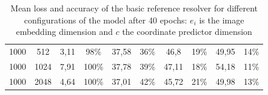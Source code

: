 \begin{table}[ht]
\begin{tabular}{cc|cc|cc|cc|cc}
        {1000} & {512}  & {3,11}                                    & {98\%}                              & {37,58}                             & {36\%}                                   & {46,8}        & {19\%}        & {49,95}       & {14\%}        \\
        {1000} & {1024} & {7,91}                                    & {100\%}                             & {37,78}                             & {39\%}                                   & {47,11}       & {18\%}        & {54,18}       & {11\%}        \\
        {1000} & {2048} & {4,64}                                    & {100\%}                             & {37,01}                             & {42\%}                                   & {45,72}       & {21\%}        & {49,98}       & {13\%}        \\
        \bottomrule
    \end{tabular}
    \caption{Mean loss and accuracy of the basic reference resolver for different configurations of the model after 40 epochs: $e_i$ is the image embedding dimension and $c$ the coordinate predictor dimension}
    \label{tab:results:reference-resolver}
\end{table}

